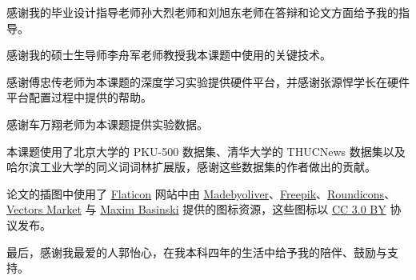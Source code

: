 
感谢我的毕业设计指导老师孙大烈老师和刘旭东老师在答辩和论文方面给予我的指导。

感谢我的硕士生导师李舟军老师教授我本课题中使用的关键技术。

感谢傅忠传老师为本课题的深度学习实验提供硬件平台，并感谢张源悍学长在硬件平台配置过程中提供的帮助。

感谢车万翔老师为本课题提供实验数据。

本课题使用了北京大学的 PKU-500 数据集、清华大学的 THUCNews 数据集以及哈尔滨工业大学的同义词词林扩展版，感谢这些数据集的作者做出的贡献。

论文的插图中使用了 \href{http://www.flaticon.com}{Flaticon} 网站中由 \href{http://www.flaticon.com/authors/madebyoliver}{Madebyoliver}、\href{http://www.freepik.com}{Freepik}、\href{http://www.flaticon.com/authors/roundicons}{Roundicons}、\href{http://www.flaticon.com/authors/vectors-market}{Vectors Market} 与 \href{http://www.flaticon.com/authors/maxim-basinski}{Maxim Basinski} 提供的图标资源，这些图标以 \href{http://creativecommons.org/licenses/by/3.0/}{CC 3.0 BY} 协议发布。

最后，感谢我最爱的人郭怡心，在我本科四年的生活中给予我的陪伴、鼓励与支持。